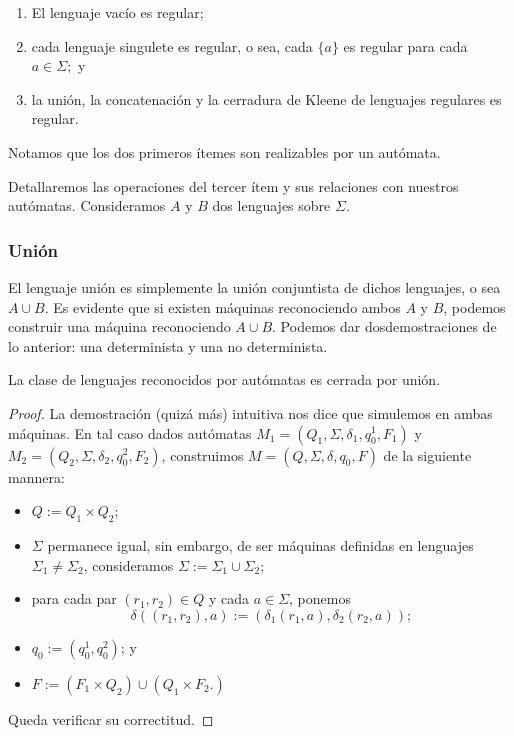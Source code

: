 \begin{enumerate}
    \item El lenguaje vac\'io es regular;
    \item cada lenguaje singulete es regular, o sea, cada \(\{a\}\) es regular para cada \(a\in\Sigma;\) y
    \item la uni\'on, la concatenaci\'on y la cerradura de Kleene de lenguajes regulares es regular.
\end{enumerate}

\begin{obs}
    Notamos que los dos primeros \'itemes son realizables por un aut\'omata.
\end{obs}

Detallaremos las operaciones del tercer \'item y sus relaciones con nuestros aut\'omatas. Consideramos \(A\) y \(B\) dos lenguajes sobre \(\Sigma\).

\subsubsection{Uni\'on}

El lenguaje uni\'on es simplemente la uni\'on conjuntista de dichos lenguajes, o sea \(A\cup B.\) Es evidente que si existen m\'aquinas reconociendo ambos \(A\) y \(B\), podemos construir una m\'aquina reconociendo \(A\cup B.\) 
Podemos dar dosdemostraciones de lo anterior: una determinista y una no determinista.

\begin{proposicion}
    La clase de lenguajes reconocidos por aut\'omatas es cerrada por uni\'on.
\end{proposicion}

\begin{proof}
    La demostraci\'on (quiz\'a m\'as) intuitiva nos dice que simulemos en ambas m\'aquinas.
    En tal caso dados aut\'omatas \(M_1=(Q_1,\Sigma,\delta_1,q_0^1,F_1)\) y \(M_2=(Q_2,\Sigma,\delta_2,q_0^2,F_2)\), construimos \(M=(Q,\Sigma,\delta,q_0,F)\) de la siguiente mannera:
    \begin{itemize}
        \item \(Q:=Q_1 \times Q_2\);
        \item \(\Sigma\) permanece igual, sin embargo, de ser m\'aquinas definidas en lenguajes \(\Sigma_1 \neq \Sigma_2\),  consideramos \(\Sigma:=\Sigma_1\cup \Sigma_2;\)
        \item para cada par \((r_1,r_2)\in Q\) y cada \(a\in \Sigma\), ponemos \[\delta((r_1,r_2),a):=(\delta_1(r_1,a),\delta_2(r_2,a));\]
        \item \(q_0:=(q_0^1,q_0^2)\); y
        \item \(F:= (F_1\times Q_2) \cup (Q_1\times F_2.)\)
    \end{itemize}

    Queda verificar su correctitud.
\end{proof}

